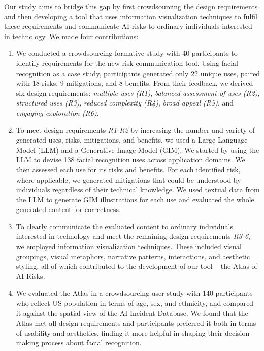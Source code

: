 Our study aims to bridge this gap by first crowdsourcing the design requirements and then developing a tool that uses information visualization techniques to fulfil these requirements and communicate AI risks to ordinary individuals interested in technology. We made four contributions:
\begin{enumerate}
    \item We conducted a crowdsourcing formative study with 40 participants to identify requirements for the new risk communication tool. Using facial recognition as a case study, participants generated only 22 unique uses, paired with 18 risks, 9 mitigations, and 8 benefits. From their feedback, we derived six design requirements: \emph{multiple uses (R1)}, \emph{balanced assessment of uses (R2)}, \emph{structured uses (R3)}, \emph{reduced complexity (R4)}, \emph{broad appeal (R5)}, and \emph{engaging exploration (R6)}.  
    \item To meet design requirements \emph{R1-R2} by increasing the number and variety of generated uses, risks, mitigations, and benefits, we used a Large Language Model (LLM) and a Generative Image Model (GIM). We started by using the LLM to devise 138 facial recognition uses across application domains. We then assessed each use for its risks and benefits. For each identified risk, where applicable, we generated mitigations that could be understood by individuals regardless of their technical knowledge. We used textual data from the LLM to generate GIM illustrations for each use and evaluated the whole generated content for correctness.
    \item To clearly communicate the evaluated content to ordinary individuals interested in technology and meet the remaining design requirements \emph{R3-6}, we employed information visualization techniques. These included visual groupings, visual metaphors, narrative patterns, interactions, and aesthetic styling, all of which contributed to the development of our tool -- the Atlas of AI Risks.
    \item We evaluated the Atlas in a crowdsourcing user study with 140 participants who reflect US population in terms of age, sex, and ethnicity, and compared it against the spatial view of the AI Incident Database. We found that the Atlas met all design requirements and participants preferred it both in terms of usability and aesthetics, finding it more helpful in shaping their decision-making process about facial recognition. 
\end{enumerate}